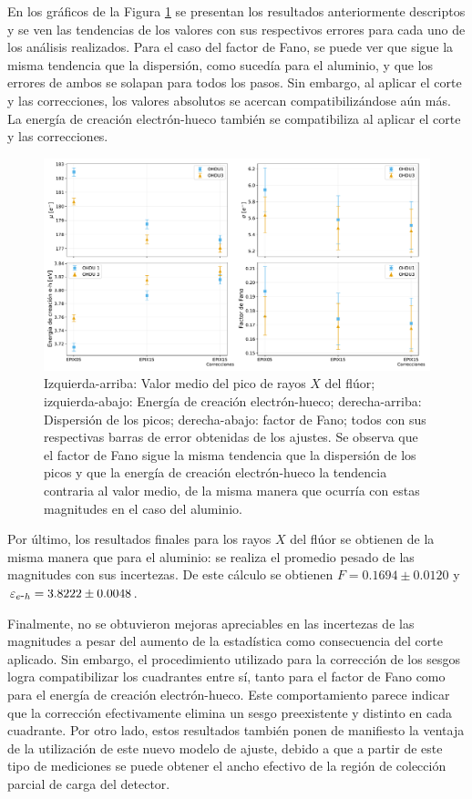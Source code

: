 En los gráficos de la Figura \ref{fig:F_mu_sigma_fano_eh} se presentan los resultados anteriormente descriptos y se ven las tendencias de los valores con sus respectivos errores para cada uno de los análisis realizados. Para el caso del factor de Fano, se puede ver que sigue la misma tendencia que la dispersión, como sucedía para el aluminio, y que los errores de ambos se solapan para todos los pasos. Sin embargo, al aplicar el corte y las correcciones, los valores absolutos se acercan compatibilizándose aún más. La energía de creación electrón-hueco también se compatibiliza al aplicar el corte y las correcciones.
\begin{figure}[h]
    \centering
        \includegraphics[scale=0.45]{Figs/F_mu_sigma_fano_Eeh.pdf}
    \caption{Izquierda-arriba: Valor medio del pico de rayos $X$ del flúor; izquierda-abajo: Energía de creación electrón-hueco; derecha-arriba: Dispersión de los picos; derecha-abajo: factor de Fano; todos con sus respectivas barras de error obtenidas de los ajustes. Se observa que el factor de Fano sigue la misma tendencia que la dispersión de los picos y que la energía de creación electrón-hueco la tendencia contraria al valor medio, de la misma manera que ocurría con estas magnitudes en el caso del aluminio.}
    \label{fig:F_mu_sigma_fano_eh}
\end{figure}

Por último, los resultados finales para los rayos $X$ del flúor se obtienen de la misma manera que para el aluminio:  se realiza el promedio pesado de las magnitudes con sus incertezas. De este cálculo se obtienen $F = 0.1694 \pm 0.0120 $ y $\varepsilon_{e\mbox{-}h} = 3.8222 \pm 0.0048$.

Finalmente, no se obtuvieron mejoras apreciables en las incertezas de las magnitudes a pesar del aumento de la estadística como consecuencia del corte aplicado. Sin embargo, el procedimiento utilizado para la corrección de los sesgos logra compatibilizar los cuadrantes entre sí, tanto para el factor de Fano como para el energía de creación electrón-hueco. Este comportamiento parece indicar que la corrección efectivamente elimina un sesgo preexistente y distinto en cada cuadrante.
Por otro lado, estos resultados también ponen de manifiesto la ventaja de la utilización de este nuevo modelo de ajuste, debido a que a partir de este tipo de mediciones se puede obtener el ancho efectivo de la región de colección parcial de carga del detector.

